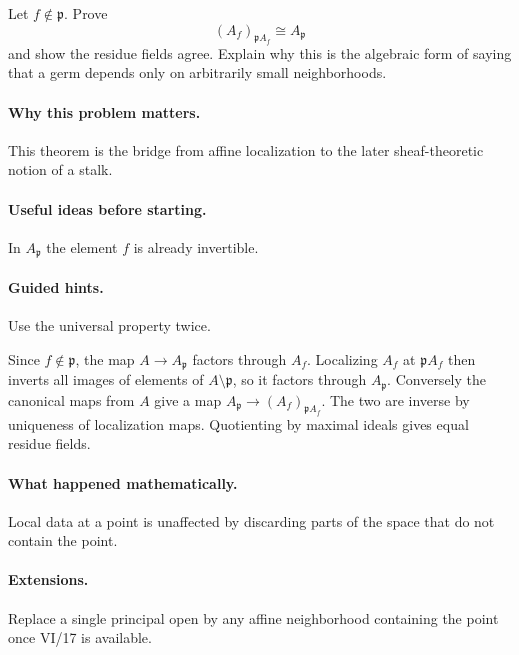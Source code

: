 \begin{problem}
Let $f\notin\mathfrak p$.  Prove
\[
(A_f)_{\mathfrak pA_f}\cong A_{\mathfrak p}
\]
and show the residue fields agree.  Explain why this is the algebraic form of saying that a germ depends only on arbitrarily small neighborhoods.
\end{problem}

\paragraph{Why this problem matters.}
This theorem is the bridge from affine localization to the later sheaf-theoretic notion of a stalk.

\paragraph{Useful ideas before starting.}
In $A_{\mathfrak p}$ the element $f$ is already invertible.

\paragraph{Guided hints.}
Use the universal property twice.

\begin{solution}
Since $f\notin\mathfrak p$, the map $A\to A_{\mathfrak p}$ factors through $A_f$.  Localizing $A_f$ at $\mathfrak pA_f$ then inverts all images of elements of $A\setminus\mathfrak p$, so it factors through $A_{\mathfrak p}$.  Conversely the canonical maps from $A$ give a map $A_{\mathfrak p}\to(A_f)_{\mathfrak pA_f}$.  The two are inverse by uniqueness of localization maps.  Quotienting by maximal ideals gives equal residue fields.
\end{solution}

\paragraph{What happened mathematically.}
Local data at a point is unaffected by discarding parts of the space that do not contain the point.

\paragraph{Extensions.}
Replace a single principal open by any affine neighborhood containing the point once VI/17 is available.
